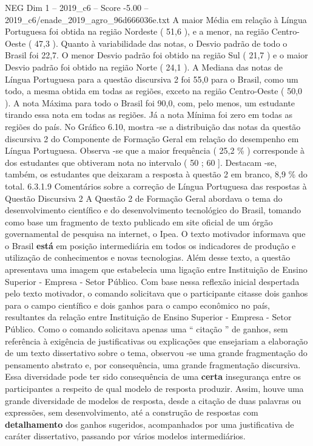 \begin{textsample}{NEG Dim 1 – 2019\_c6 – Score -5.00 – 2019\_c6/enade\_2019\_agro\_96d666036e.txt}
A maior Média em relação à Língua Portuguesa foi obtida na região Nordeste ( 51,6 ), e a menor, na região Centro-Oeste ( 47,3 ).
Quanto à variabilidade das notas, o Desvio padrão de todo o Brasil foi 22,7.
O menor Desvio padrão foi obtido na região Sul ( 21,7 ) e o maior Desvio padrão foi obtido na região Norte ( 24,1 ).
A Mediana das notas de Língua Portuguesa para a questão discursiva 2 foi 55,0 para o Brasil, como um todo, a mesma obtida em todas as regiões, exceto na região Centro-Oeste ( 50,0 ).
A nota Máxima para todo o Brasil foi 90,0, com, pelo menos, um estudante tirando essa nota em todas as regiões.
Já a nota Mínima foi zero em todas as regiões do país.
No Gráfico 6.10, mostra -se a distribuição das notas da questão discursiva 2 do Componente de Formação Geral em relação do desempenho em Língua Portuguesa.
Observa -se que a maior frequência ( 25,2 \% ) corresponde à dos estudantes que obtiveram nota no intervalo ( 50 ; 60 ].
Destacam -se, também, os estudantes que deixaram a resposta à questão 2 em branco, 8,9 \% do total. 6.3.1.9 Comentários sobre a correção de Língua Portuguesa das respostas à Questão Discursiva 2 A Questão 2 de Formação Geral abordava o tema do desenvolvimento científico e do desenvolvimento tecnológico do Brasil, tomando como base um fragmento de texto publicado em site oficial de um órgão governamental de pesquisa na internet, o Ipea.
O texto motivador informava que o Brasil \textbf{está} em posição intermediária em todos os indicadores de produção e utilização de conhecimentos e novas tecnologias.
Além desse texto, a questão apresentava uma imagem que estabelecia uma ligação entre Instituição de Ensino Superior - Empresa - Setor Público.
Com base nessa reflexão inicial despertada pelo texto motivador, o comando solicitava que o participante citasse dois ganhos para o campo científico e dois ganhos para o campo econômico no país, resultantes da relação entre Instituição de Ensino Superior - Empresa - Setor Público.
Como o comando solicitava apenas uma “ citação ” de ganhos, sem referência à exigência de justificativas ou explicações que ensejariam a elaboração de um texto dissertativo sobre o tema, observou -se uma grande fragmentação do pensamento abstrato e, por consequência, uma grande fragmentação discursiva.
Essa diversidade pode ter sido consequência de uma \textbf{certa} insegurança entre os participantes a respeito de qual modelo de resposta produzir.
Assim, houve uma grande diversidade de modelos de resposta, desde a citação de duas palavras ou expressões, sem desenvolvimento, até a construção de respostas com \textbf{detalhamento} dos ganhos sugeridos, acompanhados por uma justificativa de caráter dissertativo, passando por vários modelos intermediários.

\end{textsample}
